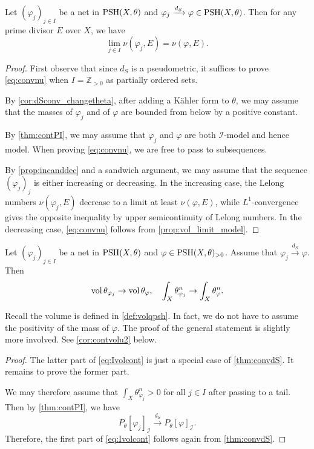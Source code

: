     \begin{theorem}\label{thm:Lelongcont}
        Let $(\varphi_j)_{j\in I}$ be a net in $\mathrm{PSH}(X,\theta)$ and $\varphi_j\xrightarrow{d_S}\varphi\in \mathrm{PSH}(X,\theta)$. Then for any prime divisor $E$ over $X$, we have
        \begin{equation}\label{eq:convnu}
        \lim_{j\in I}\nu(\varphi_j,E)=\nu(\varphi,E).
        \end{equation}
    \end{theorem}
\begin{proof}
    First observe that since $d_S$ is a pseudometric, it suffices to prove \eqref{eq:convnu} when $I=\mathbb{Z}_{>0}$ as partially ordered sets.

    By \cref{cor:dSconv_changetheta}, after adding a Kähler form to $\theta$, we may assume that the masses of $\varphi_j$ and of $\varphi$ are bounded from below by a positive constant.

    By \cref{thm:contPI}, we may assume that $\varphi_j$ and $\varphi$ are both $\mathcal{I}$-model and hence model. When proving \eqref{eq:convnu}, we are free to pass to subsequences.

    By \cref{prop:incanddec} and a sandwich argument, we may assume that the sequence $(\varphi_j)_j$ is either increasing or decreasing. In the increasing case, the Lelong numbers $\nu(\varphi_j,E)$ decrease to a limit at least $\nu(\varphi,E)$, while $L^1$-convergence gives the opposite inequality by upper semicontinuity of Lelong numbers. In the decreasing case, \eqref{eq:convnu} follows from \cref{prop:vol_limit_model}.
\end{proof}


\begin{theorem}\label{thm:contvolu}
    Let $(\varphi_j)_{j\in I}$ be a net in $\mathrm{PSH}(X,\theta)$ and $\varphi\in \mathrm{PSH}(X,\theta)_{>0}$. Assume that $\varphi_j\xrightarrow{d_S}\varphi$. Then
    \begin{equation}\label{eq:Ivolcont}
        \operatorname{vol} \theta_{\varphi_j}\to \operatorname{vol} \theta_{\varphi},\quad \int_X \theta_{\varphi_j}^n\to \int_X \theta_{\varphi}^n.
    \end{equation}
\end{theorem}
Recall the volume is defined in \cref{def:volqpsh}. In fact, we do not have to assume the positivity of the mass of $\varphi$. The proof of the general statement is slightly more involved. See \cref{cor:contvolu2} below.
\begin{proof}
    The latter part of \eqref{eq:Ivolcont} is just a special case of \cref{thm:convdS}. It remains to prove the former part.

    We may therefore assume that $\int_X \theta_{\varphi_j}^n>0$ for all $j\in I$ after passing to a tail. Then by \cref{thm:contPI}, we have
    \[
        P_{\theta}[\varphi_j]_{\mathcal{I}}\xrightarrow{d_S}P_{\theta}[\varphi]_{\mathcal{I}}.
    \]
    Therefore, the first part of \eqref{eq:Ivolcont} follows again from \cref{thm:convdS}.
\end{proof}

